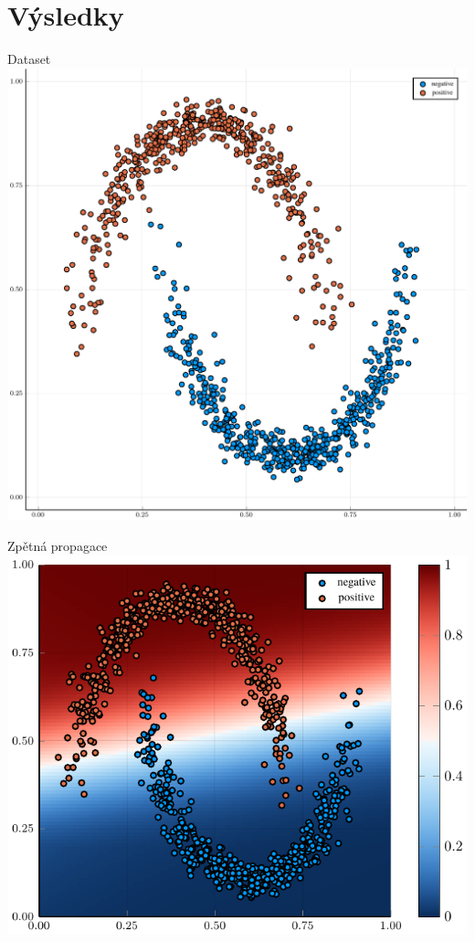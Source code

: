 \documentclass[10pt]{beamer}
\begin{document}
\section{Výsledky}

\begin{frame}{Dataset}
	\centering
	\includegraphics[width=0.6\pagewidth]{images/two-moon/two-moon.pdf}
\end{frame}

\begin{frame}{Zpětná propagace}
	\centering
	\includegraphics[width=0.6\pagewidth]{images/backprop-heatmap/backprop.pdf}
\end{frame}
\end{document}
